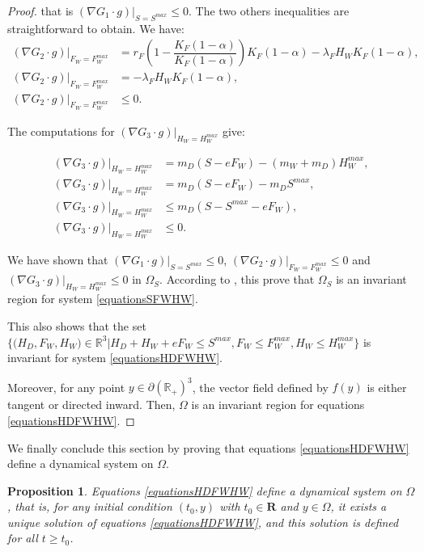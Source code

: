 \documentclass{article}
\newcommand{\lfw}{\lambda_{F}}
\newcommand{\lfw}{\lambda_{F}}
\newtheorem{prop}{Proposition}
\begin{document}
\begin{proof}
that is $(\nabla G_1 \cdot g)|_{S = S^{max}} \leq 0$. The two others inequalities are straightforward to obtain. We have:
\begin{align*}
(\nabla G_2 \cdot g)|_{F_W = F_W^{max}} &= r_F  \left(1 - \dfrac{K_F (1-\alpha)}{K_F (1-\alpha)}\right)K_F (1-\alpha)  - \lfw H_W K_F (1-\alpha), \\
(\nabla G_2 \cdot g)|_{F_W = F_W^{max}} & = - \lfw H_W K_F (1-\alpha), \\
(\nabla G_2 \cdot g)|_{F_W = F_W^{max}} & \leq 0.
\end{align*}

The computations for $(\nabla G_3 \cdot g)|_{H_W = H_W^{max}}$ give:

\begin{align*}
(\nabla G_3 \cdot g)|_{H_W = H_W^{max}} &= m_D (S - eF_W) - (m_W + m_D) H_W^{max}, \\
(\nabla G_3 \cdot g)|_{H_W = H_W^{max}} &= m_D (S - eF_W) - m_D S^{max}, \\
(\nabla G_3 \cdot g)|_{H_W = H_W^{max}} & \leq m_D (S - S^{max} -  eF_W), \\
(\nabla G_3 \cdot g)|_{H_W = H_W^{max}} & \leq 0.
\end{align*}

We have shown that $(\nabla G_1 \cdot g)|_{S = S^{max}} \leq 0$, $(\nabla G_2 \cdot g)|_{F_W = F_W^{max}} \leq 0$ and $(\nabla G_3 \cdot g)|_{H_W = H_W^{max}} \leq 0$ in  $\Omega_S$.  According to \cite{smoller_shock_1994}, this prove that $\Omega_S$ is an invariant region for system \eqref{equationsSFWHW}.

This also shows that the set  $\Big\{\Big(H_D, F_W, H_W \Big) \in \mathbb{R}^3  \Big|H_D + H_W + eF_W \leq S^{max}, F_W \leq F_W^{max}, H_W \leq H_W^{max} \Big\}$ is invariant for system \eqref{equationsHDFWHW}. 


Moreover, for any point $y \in \partial (\mathbb{R}_+)^3$, the vector field defined by $f(y)$ is either tangent or directed inward. Then, $\Omega$ is an invariant region for equations \eqref{equationsHDFWHW}. 

\end{proof}


We finally conclude this section by proving that equations \eqref{equationsHDFWHW} define a dynamical system on $\Omega$.

\begin{prop}
Equations \eqref{equationsHDFWHW} define a dynamical system on $\Omega$, that is, for any initial condition $(t_0, y)$ with $t_0 \in \mathbf{R}$ and $y \in \Omega$, it exists a unique solution of equations \eqref{equationsHDFWHW}, and this solution is defined for all $t \geq t_0$.
\end{prop}
\end{document}
